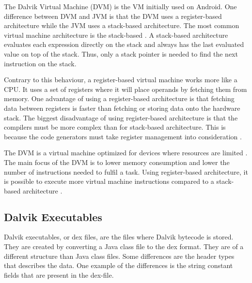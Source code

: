 
The Dalvik Virtual Machine (DVM) is the VM initially used on Android. One difference between DVM and JVM is that the DVM uses a register-based architecture while the JVM uses a stack-based architecture. The most common virtual machine architecture is the stack-based \cite[p.~158]{craig2010virtual}. A stack-based architecture evaluates each expression directly on the stack and always has the last evaluated value on top of the stack. Thus, only a stack pointer is needed to find the next instruction on the stack.

Contrary to this behaviour, a register-based virtual machine works more like a CPU. It uses a set of registers where it will place operands by fetching them from memory. One advantage of using a register-based architecture is that fetching data between registers is faster than fetching or storing data onto the hardware stack. The biggest disadvantage of using register-based architecture is that the compilers must be more complex than for stack-based architecture. This is because the code generators must take register management into consideration \cite[p.~159-160]{craig2010virtual}.

The DVM is a virtual machine optimized for devices where resources are limited \cite{android:dalvik:internals}. The main focus of the DVM is to lower memory consumption and lower the number of instructions needed to fulfil a task. Using register-based architecture, it is possible to execute more virtual machine instructions compared to a stack-based architecture \cite{shi2008virtual}. 





\subsection{Dalvik Executables}
Dalvik executables, or dex files, are the files where Dalvik bytecode is stored. They are created by converting a Java class file to the dex format. They are of a different structure than Java class files. Some differences are the header types that describes the data. One example of the differences is the string constant fields that are present in the dex-file. %

